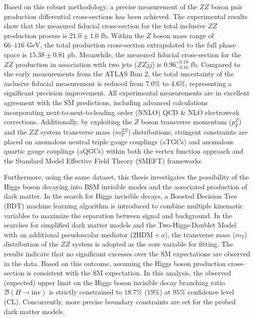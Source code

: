 \begin{abstract*}
Based on this robust methodology, a precise measurement of the $ZZ$ boson pair production differential cross-sections has been achieved. The experimental results show that the measured fiducial cross-section for the total inclusive $ZZ$ production process is $21.0 \pm 1.0\text{ fb}$. Within the $Z$ boson mass range of $66\text{--}116\text{ GeV}$, the total production cross-section extrapolated to the full phase space is $15.38 \pm 0.81\text{ pb}$. Meanwhile, the measured fiducial cross-section for the $ZZ$ production in association with two jets ($ZZjj$) is $0.96^{+0.18}_{-0.16}\text{ fb}$. Compared to the early measurements from the ATLAS Run 2, the total uncertainty of the inclusive fiducial measurement is reduced from $7.0\%$ to $4.6\%$, representing a significant precision improvement. All experimental measurements are in excellent agreement with the SM predictions, including advanced calculations incorporating next-to-next-to-leading order (NNLO) QCD \& NLO electroweak corrections. Additionally, by exploiting the $Z$ boson transverse momentum ($p_T^Z$) and the $ZZ$ system transverse mass ($m_T^{ZZ}$) distributions, stringent constraints are placed on anomalous neutral triple gauge couplings (aTGCs) and anomalous quartic gauge couplings (aQGCs) within both the vertex function approach and the Standard Model Effective Field Theory (SMEFT) frameworks.

Furthermore, using the same dataset, this thesis investigates the possibility of the Higgs boson decaying into BSM invisible modes and the associated production of dark matter. In the search for Higgs invisible decays, a Boosted Decision Tree (BDT) machine learning algorithm is introduced to combine multiple kinematic variables to maximize the separation between signal and background. In the searches for simplified dark matter models and the Two-Higgs-Doublet Model with an additional pseudoscalar mediator ($\text{2HDM}+a$), the transverse mass ($m_{T}$) distribution of the $ZZ$ system is adopted as the core variable for fitting. The results indicate that no significant excesses over the SM expectations are observed in the data. Based on this outcome, assuming the Higgs boson production cross-section is consistent with the SM expectation. In this analysis, the observed (expected) upper limit on the Higgs boson invisible decay branching ratio $\mathcal{B}(H \to \text{inv})$ is strictly constrained to $18.7\%$ ($19\%$) at $95\%$ confidence level (CL). Concurrently, more precise boundary constraints are set for the probed dark matter models.


\end{abstract*}
